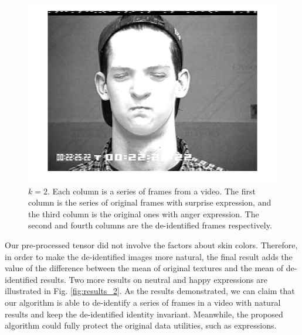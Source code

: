 \begin{figure}[!htb]
    	\includegraphics[scale=.10]{figure/89de/33.png}

		\caption{ $k=2$. Each column is a series of frames from a video. The first column is the series of
		original frames with surprise expression, and the third column is the original ones with anger expression.  
		The second and fourth columns are the de-identified frames respectively.}
		\label{fig:results}
  	\end{figure}

  	Our pre-processed tensor did not involve the factors about skin colors. Therefore, in order to make the de-identified
  	images more natural, the final result
  	adds the value of the difference between the mean of original textures and the mean of de-identified
  	results. Two more results on neutral and happy expressions are illustrated in Fig. \ref{fig:results_2}. 
  	As the results demonstrated, we can claim that our algorithm is able to de-identify a series of frames
  	in a video with natural results and keep the de-identified identity invariant. Meanwhile, the proposed
  	algorithm could fully protect the original data utilities, such as expressions. 


